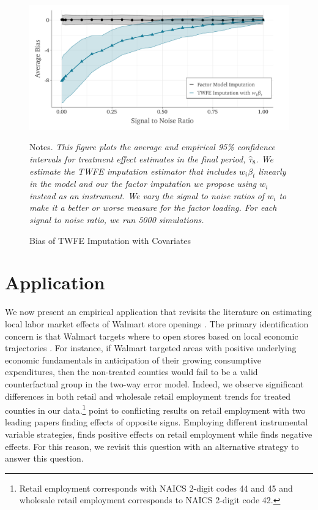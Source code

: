 \documentclass[12pt]{article}
\begin{document}
\begin{figure}
\begin{adjustbox}{width=.8\textwidth, center}
  \includegraphics{../figures/simulation-bias_signal_to_noise.pdf}
\end{adjustbox}
\caption{Bias of TWFE Imputation with Covariates}\label{fig:noisy_w}
{\footnotesize Notes. \emph{This figure plots the average and empirical 95\% confidence intervals for treatment effect estimates in the final period, $\hat{\tau}_8$. We estimate the TWFE imputation estimator that includes $w_i \beta_t$ linearly in the model and our the factor imputation we propose using $w_i$ instead as an instrument. We vary the signal to noise ratios of $w_i$ to make it a better or worse measure for the factor loading. For each signal to noise ratio, we run 5000 simulations.}}
\end{figure}


\section{Application}\label{sec:application}

We now present an empirical application that revisits the literature on estimating local labor market effects of Walmart store openings \citep{basker2005job, neumark2008effects, volpe2022economic}. The primary identification concern is that Walmart targets where to open stores based on local economic trajectories \citep{neumark2008effects}. For instance, if Walmart targeted areas with positive underlying economic fundamentals in anticipation of their growing consumptive expenditures, then the non-treated counties would fail to be a valid counterfactual group in the two-way error model. Indeed, we observe significant differences in both retail and wholesale retail employment trends for treated counties in our data.\footnote{Retail employment corresponds with NAICS 2-digit codes 44 and 45 and wholesale retail employment corresponds to NAICS 2-digit code 42.} \citet{volpe2022economic} point to conflicting results on retail employment with two leading papers finding effects of opposite signs. Employing different instrumental variable strategies, \citet{basker2005job} finds positive effects on retail employment while \citet{neumark2008effects} finds negative effects. For this reason, we revisit this question with an alternative strategy to answer this question. 
\end{document}
